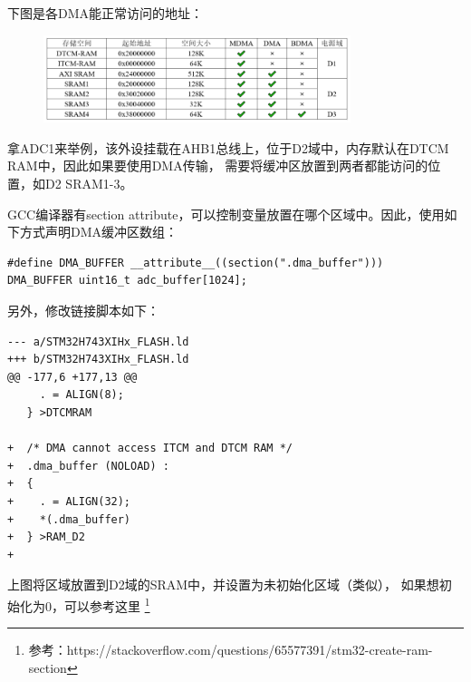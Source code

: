 下图是各DMA能正常访问的地址：

\begin{figure}[H]
\center
  \includegraphics[width=0.8\textwidth]{img/dma-section.png}
\end{figure}

拿ADC1来举例，该外设挂载在AHB1总线上，位于D2域中，内存默认在DTCM RAM中，因此如果要使用DMA传输，
需要将缓冲区放置到两者都能访问的位置，如D2 SRAM1-3。

GCC编译器有section attribute，可以控制变量放置在哪个区域中。因此，使用如下方式声明DMA缓冲区数组：

\begin{verbatim}
#define DMA_BUFFER __attribute__((section(".dma_buffer")))
DMA_BUFFER uint16_t adc_buffer[1024];
\end{verbatim}

另外，修改链接脚本如下：
\begin{verbatim}
--- a/STM32H743XIHx_FLASH.ld
+++ b/STM32H743XIHx_FLASH.ld
@@ -177,6 +177,13 @@
     . = ALIGN(8);
   } >DTCMRAM
 
+  /* DMA cannot access ITCM and DTCM RAM */
+  .dma_buffer (NOLOAD) :
+  {
+    . = ALIGN(32);
+    *(.dma_buffer)
+  } >RAM_D2
+
\end{verbatim}

上图将区域放置到D2域的SRAM中，并设置为未初始化区域（类似），
如果想初始化为0，可以参考这里
\footnote{参考：https://stackoverflow.com/questions/65577391/stm32-create-ram-section}
